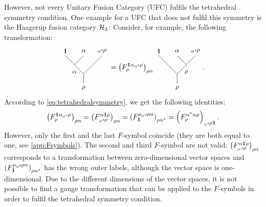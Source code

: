 However, not every Unitary Fusion Category (UFC) fulfils the tetrahedral symmetry condition. One example for a UFC that does not fulfil this symmetry is the Haagerup fusion category ${\mathcal{H}_3}$: Consider, for example, the following transformation:
	\begin{equation}
		\begin{tikzpicture}[baseline=(current bounding box.center),yscale=0.9,xscale=0.9]
			\draw (0,0.5) -- (0,1);
			\draw (0,1) -- (-0.5,1.5);
			\draw (-0.5,1.5) -- (-1,2);
			\draw (-0.5,1.5) -- (0,2);
			\draw (0,1) -- (0.5,1.5);
			\draw (0.5,1.5) -- (1,2);
			\node at (0,0.25) {\small $\rho$};
			\node at (-1,2.25) {\small $\mathbf{1}$};
			\node at (0,2.25) {\small $\alpha$};
			\node at (1,2.25) {\small $\alphastarrho$};
			\node at (-0.5,1.1) {\small $\alpha$};
		\end{tikzpicture}= \left(F_\rho^{\mathbf{1}\alpha\alphastarrho}\right)_{\rho\alpha}
		\begin{tikzpicture}[baseline=(current bounding box.center),yscale=0.9,xscale=0.9]
			\draw (0,0.5) -- (0,1);
			\draw (0,1) -- (-0.5,1.5);
			\draw (-0.5,1.5) -- (-1,2);
			\draw (0.5,1.5) -- (0,2);
			\draw (0,1) -- (0.5,1.5);
			\draw (0.5,1.5) -- (1,2);
			\node at (0,0.25) {\small $\rho$};
			\node at (-1,2.25) {\small $\mathbf{1}$};
			\node at (0,2.25) {\small $\alpha$};
			\node at (1,2.25) {\small $\alphastarrho$};
			\node at (0.5,1.1) {\small $\rho$};
		\end{tikzpicture}.
	\end{equation}
According to \cref{eq:tetrahedralsymmetry}, we get the following identities:
	\begin{equation}
		\left(F_\rho^{\mathbf{1}\alpha{}_{\alpha^*}\!\rho}\right)_{\rho\alpha}=\left(F_{{}_{\alpha^*}\!\rho}^{\alpha\mathbf{1}\rho}\right)_{\rho\alpha}=\left(F_\mathbf{1}^{\rho{}_{\alpha^*}\!\rho\alpha}\right)_{\rho\alpha^*}=\left(F_\rho^{\alpha^*\alpha\rho}\right)_{{}_{\alpha^*}\!\rho\mathbf{1}}.
	\end{equation}
However, only the first and the last $F$-symbol coincide (they are both equal to one, see \cref{app:Fsymbols}). The second and third $F$-symbol are not valid: $\left(F_{{}_{\alpha^*}\!\rho}^{\alpha\mathbf{1}\rho}\right)_{\rho\alpha}$ corresponds to a transformation between zero-dimensional vector spaces and $\left(F_\mathbf{1}^{\rho{}_{\alpha^*}\!\rho\alpha}\right)_{\rho\alpha^*}$ has the wrong outer labels, although the vector space is one-dimensional. Due to the different dimensions of the vector spaces, it is not possible to find a gauge transformation that can be applied to the $F$-symbols in order to fulfil the tetrahedral symmetry condition.

